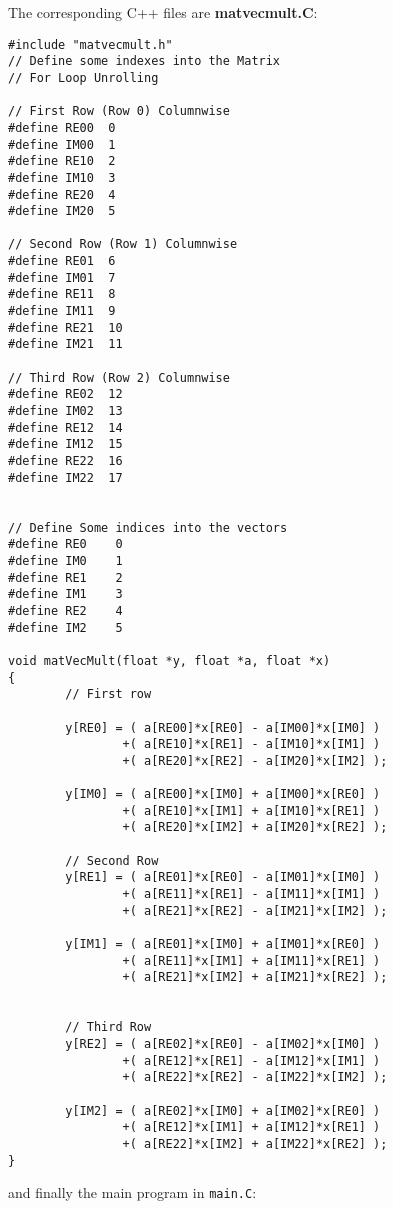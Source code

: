 The corresponding C++ files are {\bf matvecmult.C}:
{\scriptsize
\begin{verbatim}
#include "matvecmult.h"
// Define some indexes into the Matrix
// For Loop Unrolling

// First Row (Row 0) Columnwise
#define RE00  0
#define IM00  1
#define RE10  2
#define IM10  3
#define RE20  4
#define IM20  5

// Second Row (Row 1) Columnwise
#define RE01  6
#define IM01  7
#define RE11  8
#define IM11  9 
#define RE21  10
#define IM21  11

// Third Row (Row 2) Columnwise
#define RE02  12
#define IM02  13
#define RE12  14
#define IM12  15
#define RE22  16
#define IM22  17


// Define Some indices into the vectors
#define RE0    0
#define IM0    1
#define RE1    2
#define IM1    3
#define RE2    4
#define IM2    5

void matVecMult(float *y, float *a, float *x)
{
        // First row

        y[RE0] = ( a[RE00]*x[RE0] - a[IM00]*x[IM0] )
                +( a[RE10]*x[RE1] - a[IM10]*x[IM1] )
                +( a[RE20]*x[RE2] - a[IM20]*x[IM2] );

        y[IM0] = ( a[RE00]*x[IM0] + a[IM00]*x[RE0] )
                +( a[RE10]*x[IM1] + a[IM10]*x[RE1] )
                +( a[RE20]*x[IM2] + a[IM20]*x[RE2] );

        // Second Row
        y[RE1] = ( a[RE01]*x[RE0] - a[IM01]*x[IM0] )
                +( a[RE11]*x[RE1] - a[IM11]*x[IM1] )
                +( a[RE21]*x[RE2] - a[IM21]*x[IM2] );

        y[IM1] = ( a[RE01]*x[IM0] + a[IM01]*x[RE0] )
                +( a[RE11]*x[IM1] + a[IM11]*x[RE1] )
                +( a[RE21]*x[IM2] + a[IM21]*x[RE2] );


        // Third Row
        y[RE2] = ( a[RE02]*x[RE0] - a[IM02]*x[IM0] )
                +( a[RE12]*x[RE1] - a[IM12]*x[IM1] )
                +( a[RE22]*x[RE2] - a[IM22]*x[IM2] );

        y[IM2] = ( a[RE02]*x[IM0] + a[IM02]*x[RE0] )
                +( a[RE12]*x[IM1] + a[IM12]*x[RE1] )
                +( a[RE22]*x[IM2] + a[IM22]*x[RE2] );
}
\end{verbatim}}
and finally the main program in {\tt main.C}:
